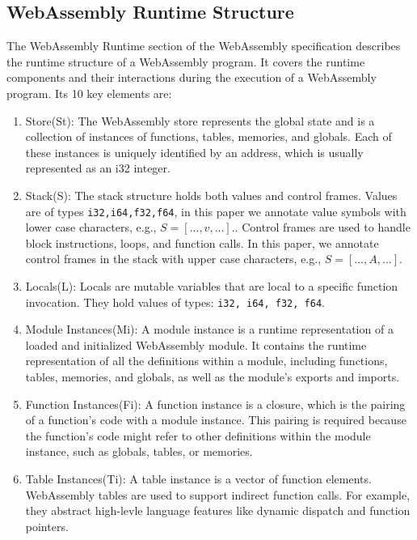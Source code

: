 \subsection{WebAssembly Runtime Structure}
\label{def:state}

The WebAssembly Runtime section of the WebAssembly specification \cite{webassembly_runtime} describes the runtime structure of a WebAssembly program. It covers the runtime components and their interactions during the execution of a WebAssembly program. Its 10 key elements are:

\begin{enumerate}
    \item Store(St): The WebAssembly store represents the global state and is a collection of instances of functions, tables, memories, and globals. Each of these instances is uniquely identified by an address, which is usually represented as an i32 integer.

    \item Stack(S): The stack structure holds both values and control frames. 
    Values are of types \texttt{i32,i64,f32,f64}, in this paper we annotate value symbols with lower case characters, e.g., $S=[...,v,...]$..
    Control frames are used to handle block instructions, loops, and function calls.
    In this paper, we annotate control frames in the stack with upper case characters, e.g., $S=[...,A,...]$.

    \item Locals(L): Locals are mutable variables that are local to a specific function invocation. They hold values of types: \texttt{i32, i64, f32, f64}.

    \item Module Instances(Mi): A module instance is a runtime representation of a loaded and initialized WebAssembly module. It contains the runtime representation of all the definitions within a module, including functions, tables, memories, and globals, as well as the module's exports and imports.

    \item Function Instances(Fi): A function instance is a closure, which is the pairing of a function's code with a module instance. This pairing is required because the function's code might refer to other definitions within the module instance, such as globals, tables, or memories.

    \item Table Instances(Ti): A table instance is a vector of function elements. WebAssembly tables are used to support indirect function calls. For example, they abstract high-levle language features like dynamic dispatch and function pointers.


\end{enumerate}
